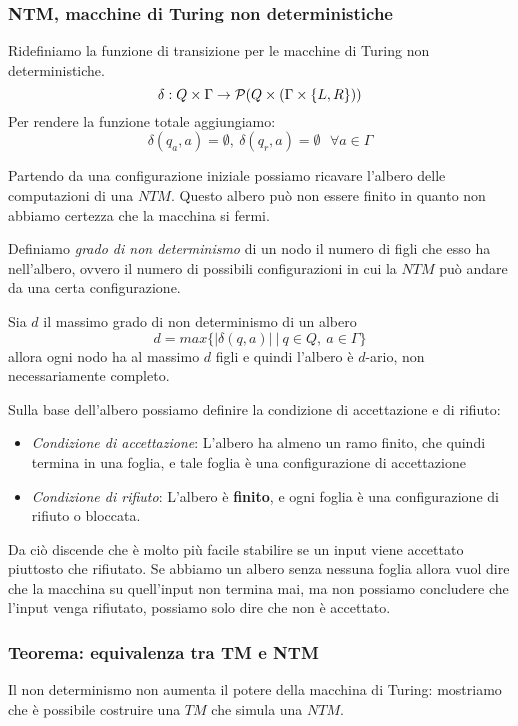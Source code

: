 \subsubsection{NTM, macchine di Turing non deterministiche} Ridefiniamo la funzione di transizione per le macchine di Turing non deterministiche. 
\[
	\delta : Q \times \Gamma \to {\cal P} (Q \times (\Gamma \times \{L, R\} ))
\]
Per rendere la funzione totale aggiungiamo:
\[
	\delta(q_a, a) = \emptyset,\ \delta(q_r, a) = \emptyset\ \ \ \forall a \in \Gamma
\]

Partendo da una configurazione iniziale possiamo ricavare l'albero delle computazioni di una $NTM$. Questo albero può non essere finito in quanto non abbiamo certezza che la macchina si fermi. 

Definiamo \textit{grado di non determinismo} di un nodo il numero di figli che esso ha nell'albero, ovvero il numero di possibili configurazioni in cui la $NTM$ può andare da una certa configurazione.

Sia $d$ il massimo grado di non determinismo di un albero $$d = max\{ |\delta(q, a)| \ | \ q \in Q, \ a \in \Gamma  \}$$
 allora ogni nodo ha al massimo $d$ figli e quindi l'albero è $d$-ario, non necessariamente completo.

Sulla base dell'albero possiamo definire la condizione di accettazione e di rifiuto:

\begin{itemize}
 \item \textit{Condizione di accettazione}: L'albero ha almeno un ramo finito, che quindi termina in una foglia, e tale foglia è una configurazione di accettazione
 
 \item \textit{Condizione di rifiuto}: L'albero è \textbf{finito}, e ogni foglia è una configurazione di rifiuto o bloccata. 
 \end{itemize} 

Da ciò discende che è molto più facile stabilire se un input viene accettato piuttosto che rifiutato. Se abbiamo un albero senza nessuna foglia allora vuol dire che la macchina su quell'input non termina mai, ma non possiamo concludere che l'input venga rifiutato, possiamo solo dire che non è accettato.

\subsubsection{Teorema: equivalenza tra TM e NTM}

Il non determinismo non aumenta il potere della macchina di Turing: mostriamo che è possibile costruire una $TM$ che simula una $NTM$.

